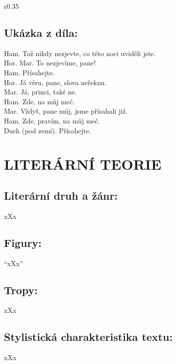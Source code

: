 \documentclass[A4paper]{extarticle} %
\begin{document}
\noindent\begin{wrapfigure}{r}{0.35\textwidth}
\tiny

\subsection*{Ukázka z díla:}
\setlength{\parindent}{3pt}
\noindent Ham. Tož nikdy nezjevte, co této noci uviděli jste. \\
Hor. Mar. To nezjevíme, pane! \\
Ham. Přísahejte. \\
Hor. Já věru, pane, slova neřeknu. \\
Mar. Já, princi, také ne. \\
Ham. Zde, na můj meč. \\
Mar. Vždyť, pane můj, jsme přísahali již. \\
Ham. Zde, pravím, na můj meč. \\
Duch (pod zemí). Přísahejte.
\end{wrapfigure}

\section*{LITERÁRNÍ TEORIE}

\subsection*{Literární druh a žánr:}
\noindent xXx



\subsection*{Figury:}
\noindent 
\enquote{xXx}

\subsection*{Tropy:}
\noindent 
xXx

\subsection*{Stylistická charakteristika textu:}
\noindent 
xXx
\end{document}
